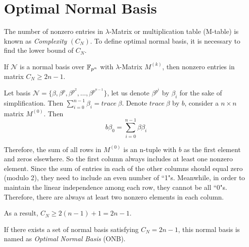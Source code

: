 \chapter{Optimal Normal Basis}
\label{append:ONB}
The number of nonzero entries in $\lambda$-Matrix or multiplication table (M-table) is known as \emph{Complexity $(C_N)$}.
To define optimal normal basis, it is necessary to find the lower bound of $C_N$.
\begin{Theorem}
If $\mathcal{N}$ is a normal basis over ${\mathbb{F}}_{p^n}$ with $\lambda$-Matrix $M^{(k)}$, then nonzero entries in matrix $C_N\geq 2n-1$.
\end{Theorem}
\begin{Proof}
Let basis $\mathcal{N} = \{\beta, \beta^p, \beta^{p^2},\dots, \beta^{p^{n-1}}\}$, let us denote $\beta^{p^i}$ by $\beta_i$ for the sake of simplification.
Then $\sum_{i=0}^{n-1} \beta_i = trace\ \beta$. 
Denote $trace\ \beta$ by $b$, consider a $n\times n$ matrix $M^{(0)}$. Then
$$b\beta_0 = \sum_{i=0}^{n-1} \beta \beta_i$$

Therefore, the sum of all rows in $M^{(0)}$ is an n-tuple with $b$ as the first element and zeros elsewhere.
So the first column always includes at least one nonzero element. 
Since the sum of entries in each of the other columns should equal zero (modulo 2), they 
need to include an even number of ``1"s.
Meanwhile, in order to maintain the linear independence among each row, they cannot be all ``0"s. 
Therefore, there are always at least two nonzero elements in each column.

As a result, $C_N \geq 2(n-1)+1  = 2n-1$.
\end{Proof}

If there exists a set of normal basis satisfying $C_N = 2n - 1$, this normal basis is named as 
\emph{Optimal Normal Basis} (ONB).

